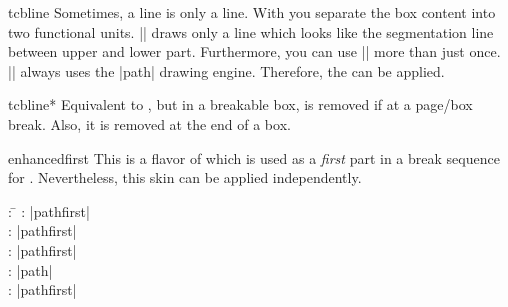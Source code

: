 \clearpage
\begin{docCommand}{tcbline}{}
  Sometimes, a line is only a line. With  you separate
  the box content into two functional units. |\tcbline| draws only a line
  which looks like the segmentation line between upper and lower part.
  Furthermore, you can use |\tcbline| more than just once.
  |\tcbline| always uses the |path| drawing engine. Therefore,
  the  can be applied.

\begin{dispExample}

\begin{tcolorbox}[colupper=red!50!black,collower=green!50!black]
\lipsum[1]
\tcbline
\lipsum[2]
\tcblower
\lipsum[3]
\tcbline
\lipsum[4]
\end{tcolorbox}
\end{dispExample}
\end{docCommand}

\begin{docCommand}{tcbline*}{}
  Equivalent to , but in a breakable box, 
  is removed if at a page/box break. Also, it is removed at the end
  of a box.
\end{docCommand}

\clearpage
\begin{docSkin}{enhancedfirst}
This is a flavor of  which is used as a \emph{first} part
in a break sequence for .
Nevertheless, this skin can be applied independently.
\begin{tcolorbox}[skintable=enhancedfirst]
  \begin{tabbing}
    : \=\kill
    :           \> |pathfirst|\\
    : \> |pathfirst|\\ 
    :        \> |pathfirst|\\
    :    \> |path|\\
    :           \> |pathfirst|
  \end{tabbing}
\end{tcolorbox}
\end{docSkin}


\begin{dispExample}
\end{dispExample}


